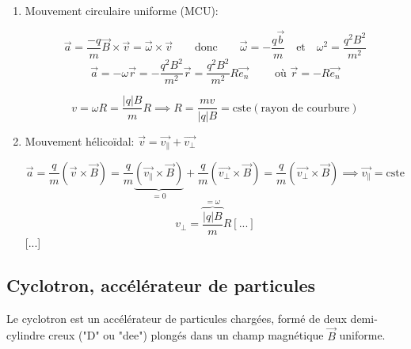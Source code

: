 \documentclass[
    11pt,
    a4paper,
    oneside,
    headinlcude, footinclude,
    twoside,
]{report}
\renewcommand{\vec}[1]{\overrightarrow{#1}}
\begin{document}
\begin{enumerate}
    \item Mouvement circulaire uniforme (MCU):

        \begin{equation}
            \label{eq:9.3} 
            \vec a = \frac{-q}{m} \vec B \times \vec v = \vec \omega \times \vec v
            \quad \quad \text{donc} \quad \quad \vec \omega = -\frac{q \vec b}{m}
            \quad \text{et} \quad \omega^2 = \frac{q^2 B^2}{m^2}
        \end{equation}
        $$\vec a = - \omega \vec r = - \frac{q^2B^2}{m^2} \vec r = \frac{q^2B^2}{m^2}
        R \vec{e_{n}} \quad \quad \text{ où } \vec r = -R \vec{e_{n}}$$

        \begin{equation}
            \label{eq:9.4} 
            v = \omega R = \frac{|q|B}{m}R \implies R = \frac{mv}{|q|B} = \text{cste}
            (\text{rayon de courbure})
        \end{equation}


    \item Mouvement hélicoïdal: $\vec v = \vec{v_{\parallel}} + \vec{v_{\perp}}$

        $$\vec a = \frac{q}{m} (\vec v \times \vec B )  = \frac{q}{m} \underbrace{(\vec{v_{\parallel}}
    \times \vec B)}_{= 0} + \frac{q}{m} (\vec{v_{\perp}} \times \vec B) = \frac{q}{m}
    (\vec{v_{\perp}} \times \vec B) \implies \vec{v_{\parallel}} = \text{cste}$$
    \begin{equation}
        v_{\perp} = \overbrace{\frac{|q|B}{m}}^{= \omega} R [...]
    \end{equation}
    [...]
    

    \begin{center}
    \end{center}

        
\end{enumerate}

\subsection{Cyclotron, accélérateur de particules}
\label{sub:cyclotron_accelerateur_de_particules}

Le cyclotron est un accélérateur de particules chargées, formé de deux
demi-cylindre creux ("D" ou "dee") plongés dans un champ magnétique $\vec B$
uniforme.
\end{document}
